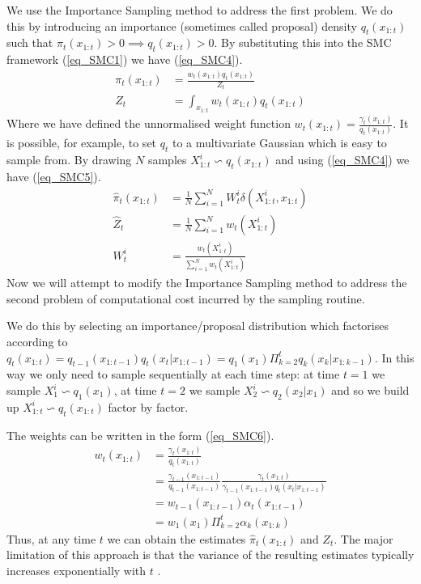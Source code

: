 \documentclass[../masters.tex]{subfiles}
\begin{document}
We use the Importance Sampling method to address the first problem. We do this by introducing an importance (sometimes called proposal) density $q_t(x_{1:t})$ such that $\pi_t(x_{1:t}) > 0 \implies q_t(x_{1:t}) > 0$. By substituting this into the SMC framework (\ref{eq_SMC1}) we have (\ref{eq_SMC4}).
\begin{equation}
\begin{aligned}
\pi_t(x_{1:t}) &= \frac{w_t(x_{1:t})q_t(x_{1:t})}{Z_t} \\
Z_t &= \int_{x_{1:t}} w_t(x_{1:t})q_t(x_{1:t})
\end{aligned}
\label{eq_SMC4}
\end{equation} 
Where we have defined the unnormalised weight function $w_t(x_{1:t}) = \frac{\gamma_t(x_{1:t})}{q_t(x_{1:t})}$. It is possible, for example, to set $q_t$ to a multivariate Gaussian which is easy to sample from. By drawing $N$ samples $X_{1:t}^i \backsim q_t(x_{1:t})$ and using (\ref{eq_SMC4}) we have (\ref{eq_SMC5}). 
\begin{equation}
\begin{aligned}
\hat{\pi}_t(x_{1:t}) &= \frac{1}{N}\sum_{i=1}^N W_t^i\delta(X^i_{1:t}, x_{1:t}) \\
\hat{Z}_t &= \frac{1}{N}\sum_{i=1}^N w_t(X^i_{1:t}) \\
W^i_t &= \frac{w_t(X^i_{1:t})}{\sum_{i=1}^N w_t(X^i_{1:t})}
\end{aligned}
\label{eq_SMC5}
\end{equation}
Now we will attempt to modify the Importance Sampling method to address the second problem of computational cost incurred by the sampling routine. 

We do this by selecting an importance/proposal distribution which factorises according to $q_t(x_{1:t}) = q_{t-1}(x_{1:t-1})q_t(x_{t}|x_{1:t-1}) = q_1(x_1) \Pi_{k=2}^t q_k(x_k|x_{1:k-1})$. In this way we only need to sample sequentially at each time step: at time $t=1$ we sample $X_1^i \backsim q_1(x_1)$, at time $t=2$ we sample $X_{2}^i \backsim q_2(x_2|x_1)$ and so we build up $X^i_{1:t} \backsim q_t(x_{1:t})$ factor by factor.

The weights can be written in the form (\ref{eq_SMC6}).
\begin{equation}
\begin{aligned}
w_t(x_{1:t}) &= \frac{\gamma_t(x_{1:t})}{q_t(x_{1:t})} \\
&= \frac{\gamma_{t-1}(x_{1:t-1})}{q_{t-1}(x_{1:t-1})}\frac{\gamma_t(x_{1:t})}{\gamma_{t-1}(x_{1:t-1})q_t(x_t|x_{1:t-1})} \\
&= w_{t-1}(x_{1:t-1})\alpha_t(x_{1:t-1}) \\
&= w_1(x_1)\Pi_{k=2}^t \alpha_k(x_{1:k})
\end{aligned}
\label{eq_SMC6}
\end{equation}
Thus, at any time $t$ we can obtain the estimates $\hat{\pi}_t(x_{1:t})$ and $Z_t$. The major limitation of this approach is that the variance of the resulting estimates typically increases exponentially with $t$ \cite{pftut}. 
\end{document}
